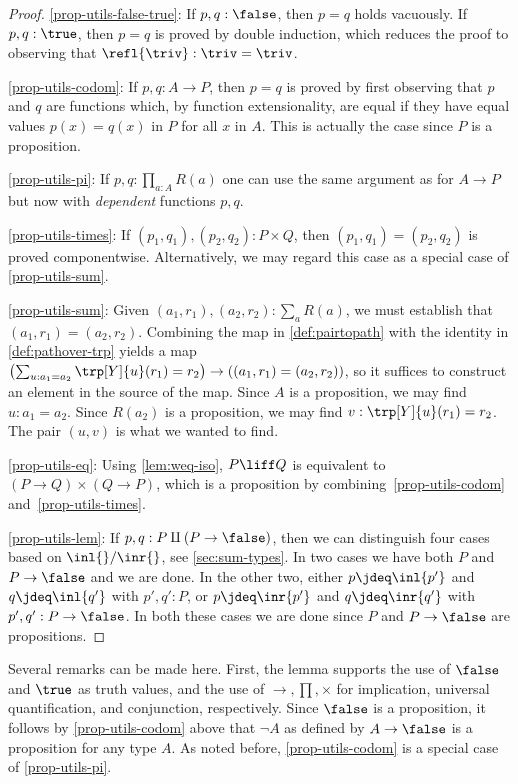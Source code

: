 \begin{proof}
\ref{prop-utils-false-true}:
If $p,q : \false$, then $p=q$ holds vacuously.
If $p,q : \true$, then $p=q$ is proved by double induction,
which reduces the proof to observing that $\refl{\triv}: \triv=\triv$.

\ref{prop-utils-codom}:
If $p,q : A\to P$, then $p=q$ is proved by first observing that $p$ and $q$
are functions which, by function extensionality, are equal if they have
equal values $p(x) = q(x)$ in $P$ for all $x$ in $A$. This is
actually the case since $P$ is a proposition.

\ref{prop-utils-pi}:
If $p,q : \prod_{a:A} R(a)$ one can use the same argument as for $A\to P$
but now with \emph{dependent} functions $p,q$.

\ref{prop-utils-times}:
If $(p_1,q_1),(p_2,q_2) : P\times Q$, then $(p_1,q_1)=(p_2,q_2)$
is proved componentwise.  Alternatively, we may regard this case as a special case of \ref{prop-utils-sum}.

\ref{prop-utils-sum}:
Given $(a_1,r_1), (a_2,r_2) : \sum_a R(a)$, we must establish that $(a_1,r_1) = (a_2,r_2)$.  Combining the map in \cref{def:pairtopath} with the
identity in \cref{def:pathover-trp} yields a map $ \left( \sum_{u : a_1 = a_2} \trp[Y]{u}(r_1)=r_2 \right) \to \left( (a_1,r_1) = (a_2,r_2)
\right)$, so it suffices to construct an element in the source of the map.  Since $A$ is a proposition, we may find $u : a_1 = a_2$.  Since
$R(a_2)$ is a proposition, we may find $v : \trp[Y]{u}(r_1)=r_2$.  The pair $(u,v)$ is what we wanted to find.

\ref{prop-utils-eq}:
Using \cref{lem:weq-iso}, $P \liff Q$ is equivalent to
$(P\to Q)\times(Q\to P)$, which is a proposition by
combining~\ref{prop-utils-codom} and~\ref{prop-utils-times}.

\ref{prop-utils-lem}:
If $p,q : P\amalg (P\to\false)$, then we can distinguish four cases
based on $\inl{}/\inr{}$, see \cref{sec:sum-types}. In two cases
we have both $P$ and $P\to\false$ and we are done. In the other two,
either $p\jdeq \inl{p'}$ and $q\jdeq \inl{q'}$ with $p',q':P$,
or $p\jdeq \inr{p'}$ and $q\jdeq \inr{q'}$ with $p',q':P\to\false$.
In both these cases we are done since $P$ and $P\to\false$
are propositions.
\end{proof}

Several remarks can be made here. First, the lemma supports the
use of $\false$ and $\true$ as truth values, and the use of
$\to,\prod,\times$ for implication, universal quantification,
and conjunction, respectively. Since $\false$ is a proposition,
it follows by \ref{prop-utils-codom} above that
$\neg A$ as defined by $A\to\false$ is a proposition for any type $A$.
As noted before, \ref{prop-utils-codom} is a
special case of \ref{prop-utils-pi}.

